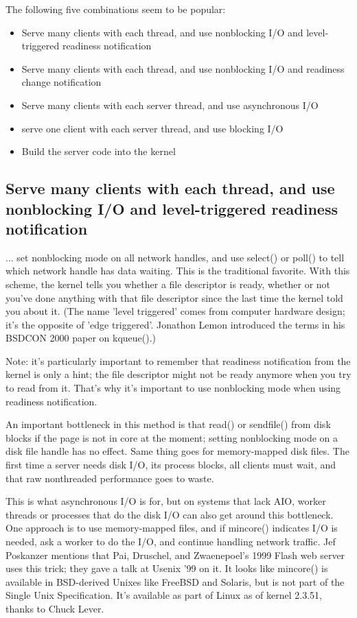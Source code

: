 \documentclass[12pt, twoside, a4paper, xetex]{report}
\begin{document}
The following five combinations seem to be popular:

	\begin{itemize}
	\item Serve many clients with each thread, and use nonblocking I/O and level-triggered readiness notification
	\item Serve many clients with each thread, and use nonblocking I/O and readiness change notification
	\item Serve many clients with each server thread, and use asynchronous I/O
	\item serve one client with each server thread, and use blocking I/O
	\item Build the server code into the kernel
	\end{itemize}
\subsection*{Serve many clients with each thread, and use nonblocking I/O and level-triggered readiness notification}

... set nonblocking mode on all network handles, and use select() or poll() to tell which network handle has data waiting. This is the traditional favorite. With this scheme, the kernel tells you whether a file descriptor is ready, whether or not you've done anything with that file descriptor since the last time the kernel told you about it. (The name 'level triggered' comes from computer hardware design; it's the opposite of 'edge triggered'. Jonathon Lemon introduced the terms in his BSDCON 2000 paper on kqueue().)

Note: it's particularly important to remember that readiness notification from the kernel is only a hint; the file descriptor might not be ready anymore when you try to read from it. That's why it's important to use nonblocking mode when using readiness notification.

An important bottleneck in this method is that read() or sendfile() from disk blocks if the page is not in core at the moment; setting nonblocking mode on a disk file handle has no effect. Same thing goes for memory-mapped disk files. The first time a server needs disk I/O, its process blocks, all clients must wait, and that raw nonthreaded performance goes to waste. 

This is what asynchronous I/O is for, but on systems that lack AIO, worker threads or processes that do the disk I/O can also get around this bottleneck. One approach is to use memory-mapped files, and if mincore() indicates I/O is needed, ask a worker to do the I/O, and continue handling network traffic. Jef Poskanzer mentions that Pai, Druschel, and Zwaenepoel's 1999 Flash web server uses this trick; they gave a talk at Usenix '99 on it. It looks like mincore() is available in BSD-derived Unixes like FreeBSD and Solaris, but is not part of the Single Unix Specification. It's available as part of Linux as of kernel 2.3.51, thanks to Chuck Lever.
\end{document}
